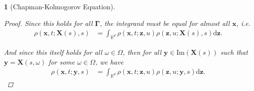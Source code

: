 \documentclass[english]{article}
\numberwithin{equation}{section}
\numberwithin{figure}{section}
\theoremstyle{bolddescit}
\newtheorem{theorem}{\protect\theoremname}[section]
\theoremstyle{definition}
\theoremstyle{definition}
\theoremstyle{plain}
\theoremstyle{plain}
\theoremstyle{bolddesc}
\theoremstyle{plain}
\theoremstyle{remark}
\providecommand{\theoremname}{Theorem}
\begin{document}
\begin{theorem}[Chapman-Kolmogorov Equation]
\begin{proof}
    Since this holds for all $\mathbf{\Gamma}$, the integrand must be equal for almost all $\mathbf{x}$, i.e.
    \begin{align*}
      \rho(\mathbf{x},t;\mathbf{X}(s),s)
      &= \int_{\mathbb{R}^d} \rho(\mathbf{x},t;\mathbf{z},u) \rho(\mathbf{z},u;\mathbf{X}(s),s) \mathrm{d}\mathbf{z}.
    \end{align*}

    And since this itself holds for all $\omega \in \Omega$, then for all $\mathbf{y} \in \mathrm{Im}(\mathbf{X}(s))$ such that $\mathbf{y} = \mathbf{X}(s,\omega)$ for some $\omega \in \Omega$, we have
    \begin{align*}
      \rho(\mathbf{x},t;\mathbf{y},s)
      &= \int_{\mathbb{R}^d} \rho(\mathbf{x},t;\mathbf{z},u) \rho(\mathbf{z},u;\mathbf{y},s) \mathrm{d}\mathbf{z}.
    \end{align*}
  \end{proof}
\end{theorem}
\end{document}
